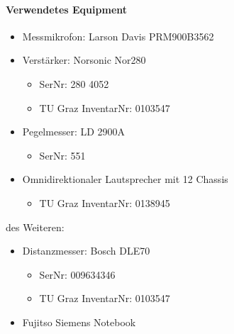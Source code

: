 \documentclass[11pt]{report}
\begin{document}
\paragraph{Verwendetes Equipment}
\begin{itemize}
\item Messmikrofon: Larson Davis PRM900B3562
\item Verst\"arker: Norsonic Nor280
\begin{itemize}
\item SerNr: 280 4052
\item TU Graz InventarNr: 0103547
\end{itemize}
\item Pegelmesser: LD 2900A
\begin{itemize}
\item SerNr: 551
\end{itemize}
\item Omnidirektionaler Lautsprecher mit 12 Chassis
\begin{itemize}
\item TU Graz InventarNr: 0138945
\end{itemize}
\end{itemize}
des Weiteren:
\begin{itemize}
\item Distanzmesser: Bosch DLE70
\begin{itemize}
\item SerNr: 009634346
\item TU Graz InventarNr: 0103547
\end{itemize}
\item Fujitso Siemens Notebook
\end{itemize}
\end{document}
